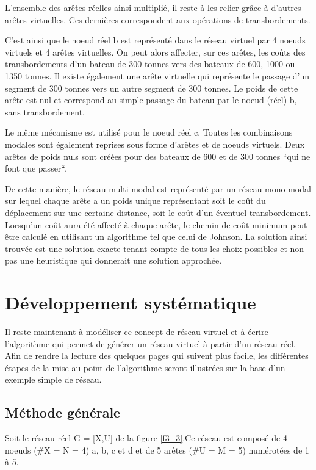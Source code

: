 L'ensemble des arêtes réelles ainsi multiplié, il reste à les
relier grâce à d'autres arêtes virtuelles. Ces dernières
correspondent aux opérations de transbordements.

C'est ainsi que le noeud réel b est représenté dans le réseau
virtuel par 4 noeuds virtuels et 4 arêtes virtuelles. On peut alors
affecter, sur ces arêtes, les coûts des transbordements d'un bateau
de 300 tonnes vers des bateaux de 600, 1000 ou 1350 tonnes. Il
existe également une arête virtuelle qui représente le passage d'un
segment de 300 tonnes vers un autre segment de 300 tonnes. Le poids
de cette arête est nul et correspond au simple passage du bateau
par le noeud (réel) b, sans transbordement.

Le même mécanisme est utilisé pour le noeud réel c. Toutes les combinaisons
modales sont également reprises sous forme d'arêtes et de noeuds virtuels. Deux
arêtes de poids nuls sont créées pour des bateaux de 600 et de 300 tonnes ``qui
ne font que passer``.

De cette manière, le réseau multi-modal est représenté par un réseau mono-modal
sur lequel chaque arête a un poids unique représentant soit le coût du
déplacement sur une certaine distance, soit le coût d'un éventuel
transbordement. Lorsqu'un coût aura été affecté à chaque arête, le chemin de
coût minimum peut être calculé en utilisant un algorithme tel que celui de
Johnson. La solution ainsi trouvée est une solution exacte tenant compte de tous
les choix possibles et non pas une heuristique qui donnerait une solution
approchée.

\section{ D\'eveloppement syst\'ematique}

Il reste maintenant à modéliser ce concept de réseau virtuel et à
écrire l'algorithme qui permet de générer un réseau virtuel à
partir d'un réseau réel. Afin de rendre la lecture des quelques
pages qui suivent plus facile, les différentes étapes de la mise au
point de l'algorithme seront illustrées sur la base d'un exemple
simple de réseau.


\subsection{M\'ethode g\'en\'erale}\label{Methode generale}


Soit le réseau réel G = [X,U] de la figure \ref{f3_3}.Ce réseau est composé de 4
noeuds (\#X = N = 4) a, b, c et d et de 5 arêtes (\#U = M = 5) numérotées de 1 à
5.


